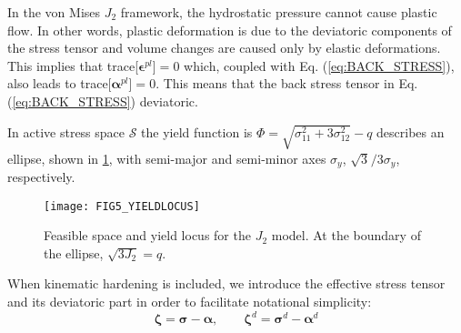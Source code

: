 In the von Mises $J_2$ framework, the hydrostatic pressure cannot cause plastic
flow.
In other words, plastic deformation is due to the deviatoric components of the 
stress tensor and volume changes are caused only by elastic deformations. This
implies that trace[$\bm{\epsilon}^{pl}$]$=0$ which, coupled with Eq.
(\ref{eq:BACK_STRESS}), also leads to trace[$\bm{\alpha}^{pl}$]$=0$. This means 
that
the back stress tensor in Eq. (\ref{eq:BACK_STRESS}) deviatoric.

In active stress space $\mathcal{S}$ the yield function is 
$\Phi = \sqrt{\sigma_{11}^2 + 3\sigma_{12}^2}-q$ describes an ellipse, shown
in \ref{fig:FIG5_YIELDLOCUS}, with
semi-major and semi-minor axes $\sigma_y$, $\sqrt{3}^{}/3\sigma_y$, 
respectively.

\begin{figure}[t]
	\centering
	\texttt{[image: FIG5\_YIELDLOCUS]}
	\caption{Feasible space and yield locus for the $J_2$ model. At the 
	boundary of the ellipse,
		$\sqrt{3J_2}=q$.}
	\label{fig:FIG5_YIELDLOCUS}
\end{figure}

When kinematic
hardening is included, we introduce the effective stress tensor and its
deviatoric part in order to facilitate notational simplicity:
\begin{equation}
	\bm{\zeta} = \bm{\sigma}-\bm{\alpha},\qquad \bm{\zeta}^d =
	\bm{\sigma}^d-\bm{\alpha}^d
	\label{eq:EFFECTIVE_STRESS}
\end{equation}

